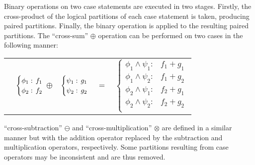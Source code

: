 Binary operations on two case statements are executed in two stages.
Firstly, the cross-product of the logical partitions of each case statement 
is taken, producing paired partitions. Finally, the binary operation 
is applied to the resulting paired partitions. The ``cross-sum'' $\oplus$
operation can be performed on two cases in the following manner:

{\small 
\abovedisplayskip=0pt
\belowdisplayskip=0pt
\begin{center}
  \begin{tabular}{r c c c l}
  &
    $\begin{cases}
        \phi_1: \hspace{-1mm} & \hspace{-1mm} f_1  \\ 
        \phi_2: \hspace{-1mm} & \hspace{-1mm} f_2  \\ 
    \end{cases}$
  $\oplus$
  &
  \hspace{-4mm}
    $\begin{cases}
        \psi_1: \hspace{-1mm} & \hspace{-1mm} g_1  \\ 
        \psi_2: \hspace{-1mm} & \hspace{-1mm} g_2  \\ 
    \end{cases}$
  &
  \hspace{-4mm} 
  $ = $
  &
  \hspace{-4mm}
    $\begin{cases}
      \phi_1 \wedge \psi_1: & f_1 + g_1 \\
      \phi_1 \wedge \psi_2: & f_1 + g_2 \\
      \phi_2 \wedge \psi_1: & f_2 + g_1 \\
      \phi_2 \wedge \psi_2: & f_2 + g_2  \\
    \end{cases}$
  \end{tabular}
\end{center}
}%

``cross-subtraction''  $\ominus$ and ``cross-multiplication'' $\otimes$
are defined in a similar manner but with the addition operator replaced
by the subtraction and multiplication operators, respectively.
Some partitions resulting from case operators may be inconsistent and 
are thus removed. 

